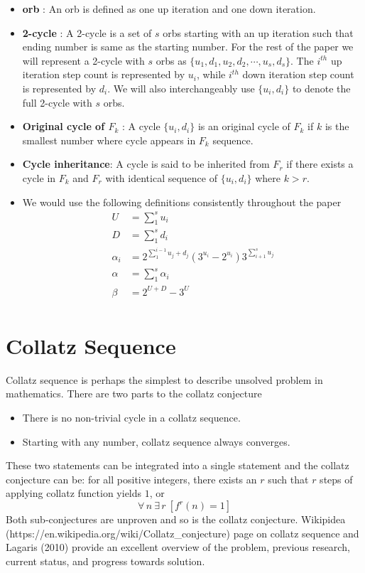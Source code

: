 \documentclass[12pt]{article} %
\begin{document}
\begin{itemize}
      \item \textbf{orb} : An orb is defined as one up iteration and one down iteration.
      
      \item \textbf{2-cycle} : A 2-cycle is a set of $s$ orbs starting with an up iteration such that ending number is same as the starting number. For the rest of the paper we will represent a 2-cycle with $s$ orbs as $\{ u_1, d_1, u_2, d_2, \cdots , u_s, d_s \}$.  The $i^{th}$ up iteration step count is represented by $u_i$, while $i^{th}$ down iteration step count is represented by $d_i$. We will also interchangeably use $\{u_i, d_i\}$ to denote the full 2-cycle with $s$ orbs.
      
      \item \textbf{Original cycle of $F_k$} : A cycle $\{u_i, d_i\}$ is an original cycle of $F_k$ if $k$ is the smallest number where cycle appears in $F_k$ sequence.
      \item \textbf{Cycle inheritance}: A cycle is said to  be inherited from $F_r$ if there exists a cycle in $F_k$ and $F_r$ with identical sequence of $\{u_i,d_i\}$ where $k>r$.
      \item We would use the following definitions consistently throughout the paper
      \begin{align*}
            U  & = \sum_{1}^{s}u_i\\
            D  & = \sum_{1}^{s}d_i\\    
            \alpha_{i} & = 2^{\sum_{1}^{i-1}{u_j + d_j}} (3^{u_i} - 2^{u_i})3^{\sum_{i+1}^{s}u_j}\\
            \alpha & = \sum_{1}^{s} \alpha_{i}\\
            \beta  & = 2^{U + D} - 3^{U}\\ 
      \end{align*}
\end{itemize}

\section{Collatz Sequence}

Collatz sequence is perhaps the simplest to describe unsolved problem in mathematics. There are two parts to the collatz conjecture
\begin{itemize}
    \item There is no non-trivial cycle in a collatz sequence.
    \item Starting with any number, collatz sequence always converges.
\end{itemize}
These two statements can be integrated into a single statement and the collatz conjecture can be: for all positive integers, there exists an $r$ such that $r$ steps of applying collatz function yields $1$, or 
\[\forall \, n \: \exists \, r \: [ f^r(n) = 1]\]
Both sub-conjectures are unproven and so is the collatz conjecture. Wikipidea (https://en.wikipedia.org/wiki/Collatz\_conjecture) page on collatz sequence and Lagaris (2010) \cite{lagarisbook} provide an excellent overview of the problem, previous research, current status, and progress towards solution. 
\end{document}
